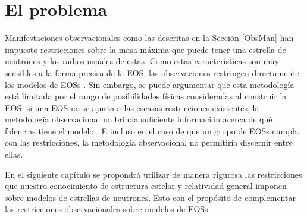\section{El problema}
Manifestaciones observacionales como las descritas en la Sección \ref{ObsMan} han impuesto restricciones sobre la masa máxima que puede tener una estrella de neutrones y los radios usuales de estas. Como estas características son muy sensibles a la forma precisa de la EOS, las observaciones restringen directamente los modelos de EOSs \cite{Ozel2016}. Sin embargo, se puede argumentar que esta metodología está limitada por el rango de posibilidades físicas consideradas al construir la EOS: si una EOS no se ajusta a las escasas restricciones existentes, la metodología observacional no brinda suficiente información acerca de qué falencias tiene el modelo \cite{Raithel2017}. E incluso en el caso de que un grupo de EOSs cumpla con las restricciones, la metodología observacional no permitiría discernir entre ellas. 

En el siguiente capítulo se propondrá utilizar de manera rigurosa las restricciones que nuestro conocimiento de estructura estelar y relatividad general imponen sobre modelos de estrellas de neutrones. Esto con el propósito de complementar las restricciones observacionales sobre modelos de EOSs.